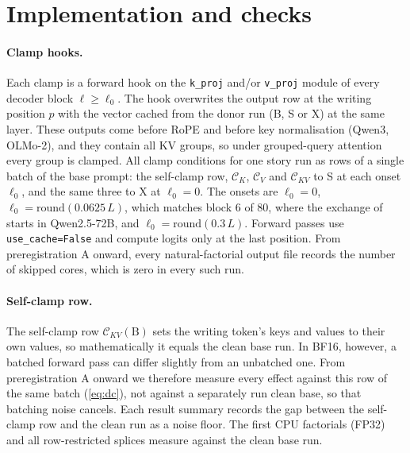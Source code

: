 \clearpage
\section{Implementation and checks}\label{app:impl}

\paragraph{Clamp hooks.} Each clamp is a forward hook on the \texttt{k\_proj} and/or \texttt{v\_proj} module of every decoder block $\ell \geq \ell_0$. The hook overwrites the output row at the writing position $p$ with the vector cached from the donor run (B, S or X) at the same layer. These outputs come before RoPE and before key normalisation (Qwen3, OLMo-2), and they contain all KV groups, so under grouped-query attention every group is clamped. All clamp conditions for one story run as rows of a single batch of the base prompt: the self-clamp row, $\mathcal{C}_K$, $\mathcal{C}_V$ and $\mathcal{C}_{KV}$ to S at each onset $\ell_0$, and the same three to X at $\ell_0 = 0$. The onsets are $\ell_0 = 0$, $\ell_0 = \mathrm{round}(0.0625\,L)$, which matches block 6 of 80, where the exchange of \citet{anonymous2026fitted} starts in Qwen2.5-72B, and $\ell_0 = \mathrm{round}(0.3\,L)$. Forward passes use \texttt{use\_cache=False} and compute logits only at the last position. From preregistration A onward, every natural-factorial output file records the number of skipped cores, which is zero in every such run.

\paragraph{Self-clamp row.} The self-clamp row $\mathcal{C}_{KV}(\mathrm{B})$ sets the writing token's keys and values to their own values, so mathematically it equals the clean base run. In BF16, however, a batched forward pass can differ slightly from an unbatched one. From preregistration A onward we therefore measure every effect against this row of the same batch (\cref{eq:dc}), not against a separately run clean base, so that batching noise cancels. Each result summary records the gap between the self-clamp row and the clean run as a noise floor. The first CPU factorials (FP32) and all row-restricted splices measure against the clean base run.

